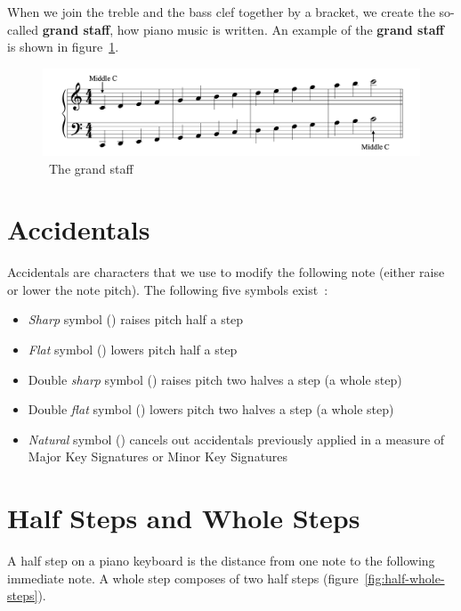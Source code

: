 When we join the treble and the bass clef together by a bracket, we create the so-called \textbf{grand staff}, how piano music is written.
An example of the \textbf{grand staff} is shown in figure~\ref{fig:grand-staff}.~\cite{music-theory}


\begin{figure}
    \centering
    \includegraphics[width=\textwidth]{assets/grand-staff}
    \caption{~The grand staff~\cite{music-theory}}\label{fig:grand-staff}
\end{figure}


\section{Accidentals}\label{sec:accidentals}

Accidentals are characters that we use to modify the following note (either raise or lower the note pitch).
The following five symbols exist~\cite{music-theory}:

\begin{itemize}
    \item \textit{Sharp} symbol (\sh) raises pitch half a step
    \item \textit{Flat} symbol (\fl) lowers pitch half a step
    \item Double \textit{sharp} symbol (\musDoubleSharp) raises pitch two halves a step (a whole step)
    \item Double \textit{flat} symbol (\musDoubleFlat) lowers pitch two halves a step (a whole step)
    \item \textit{Natural} symbol (\na) cancels out accidentals previously applied in a measure of Major Key Signatures or Minor Key Signatures
\end{itemize}


\section{Half Steps and Whole Steps}\label{sec:half-whole-steps}

A half step on a piano keyboard is the distance from one note to the following immediate note.
A whole step composes of two half steps (figure~\ref{fig:half-whole-steps}).~\cite{music-theory}



